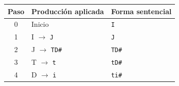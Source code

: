\begin{tabular}{|c|l|l|}\hline
\rowcolor{cabecera}\textbf{Paso}&\textbf{Producción aplicada}&\textbf{Forma sentencial}\\\hline
0 & Inicio & \texttt{I} \\
1 & I $\to$ \texttt{J} & \texttt{J} \\
2 & J $\to$ \texttt{TD\#} & \texttt{TD\#} \\
3 & T $\to$ \texttt{t} & \texttt{tD\#} \\
4 & D $\to$ \texttt{i} & \texttt{ti\#} \\
\hline\end{tabular}
